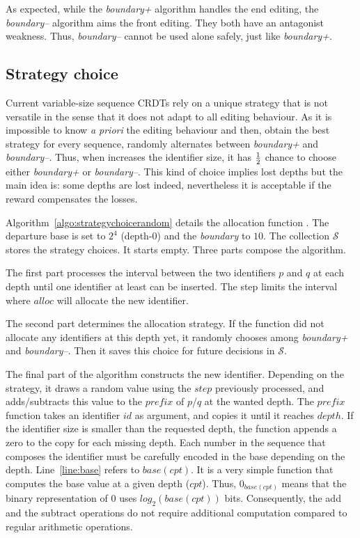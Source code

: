 As expected, while the \emph{boundary+} algorithm handles the end editing,
the \emph{boundary--} algorithm aims the front editing. They both have
an antagonist weakness. Thus, \emph{boundary--} cannot be used alone safely,
just like \emph{boundary+}.

\subsection{Strategy choice}

Current variable-size sequence CRDTs rely on a unique strategy that is not
versatile in the sense that it does not adapt to all editing behaviour. As it
is impossible to know \emph{a priori} the editing behaviour and then, obtain
the best strategy for every sequence, \NAME{} randomly alternates between
\emph{boundary+} and \emph{boundary--}. Thus, when \NAME{} increases the
identifier size, it has $1\over{2}$ chance to choose either \emph{boundary+} or
\emph{boundary--}. This kind of choice implies lost depths but the main idea
is: some depths are lost indeed, nevertheless it is acceptable if the reward
compensates the losses.



Algorithm~\ref{algo:strategychoicerandom} details the allocation function
\NAME{}. The departure base is set to $2^4$ (depth-0) and the \emph{boundary}
to $10$. The collection $\mathcal{S}$ stores the strategy choices. It starts
empty. Three parts compose the algorithm.
\begin{inparaenum}[(1)]
\item The first part processes the interval between the two identifiers $p$ and
  $q$ at each depth until one identifier at least can be inserted. The step
  limits the interval where $alloc$ will allocate the new identifier.
  \item The second part determines the allocation strategy. If the function did
    not allocate any identifiers at this depth yet, it randomly chooses among
    \emph{boundary+} and \emph{boundary--}. Then it saves this choice for
    future decisions in $\mathcal{S}$.
  \item The final part of the algorithm constructs the new
    identifier. Depending on the strategy, it draws a random value using the
    $step$ previously processed, and adds/subtracts this value to the $prefix$
    of $p$/$q$ at the wanted depth. The $prefix$ function takes an identifier
    $id$ as argument, and copies it until it reaches $depth$. If the identifier
    size is smaller than the requested depth, the function appends a zero to
    the copy for each missing depth. Each number in the sequence that composes
    the identifier must be carefully encoded in the base depending on the
    depth. Line~\ref{line:base} refers to $base(cpt)$. It is a very simple
    function that computes the base value at a given depth ($cpt$). Thus,
    $0_{base(cpt)}$ means that the binary representation of $0$ uses
    $log_2(base(cpt))$ bits. Consequently, the add and the subtract operations
    do not require additional computation compared to regular arithmetic
    operations.
\end{inparaenum}

